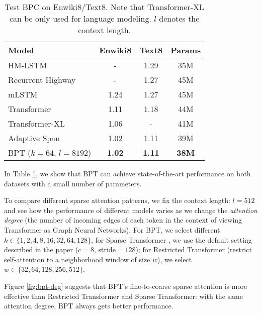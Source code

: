 \documentclass[11pt,a4paper]{article}
\begin{document}
\begin{table}[!htb]
\small\setlength{\tabcolsep}{2pt}
\centering
\begin{tabular}{p{14em}ccc}
\toprule
Model              & Enwiki8 & Text8 & Params \\
\midrule
HM-LSTM~\cite{ChungAB17}           & -      & 1.29 & 35M  \\
Recurrent Highway~\cite{ZillySKS17}  & -      & 1.27  & 45M \\
mLSTM~\cite{krause2016multiplicative}             & 1.24   & 1.27 & 45M \\
\midrule
Transformer~\cite{al2018character} & 1.11   & 1.18 & 44M \\
Transformer-XL~\cite{dai2019transformer}     & 1.06   & - & 41M \\
Adaptive Span~\cite{sukhbaatar2019adaptive} & 1.02 & 1.11 & 39M \\
\midrule
BPT ($k=64$, $l=8192$)       & \bf{1.02} & \bf{1.11} & \bf{38M} \\
\bottomrule
\end{tabular}
\caption{Test BPC on Enwiki8/Text8.  Note that Transformer-XL can be only used for language modeling. $l$ denotes the context length.}
\label{tbl:char}
\end{table}

In Table \ref{tbl:char}, we show that BPT can achieve state-of-the-art performance on both datasets with a small number of parameters.

To compare different sparse attention patterns, we fix the context length: $l=512$ and see how the performance of different models varies as we change the \textit{attention degree} (the number of incoming edges of each token in the context of viewing Transformer as Graph Neural Networks). For BPT, we select different $k\in \{1,2,4,8,16,32,64,128\}$, for Sparse Transformer \citep{child2019sparsetransformer}, we use the default setting described in the paper ($c=8$, $\mathrm{stride}=128$); for Restricted Transformer \citep{vaswani2017attention} (restrict self-attention to a neighborhood window of size $w$), we select $w\in\{32, 64, 128, 256, 512\}$.

Figure \ref{fig:bpt-deg} suggests that BPT's fine-to-coarse sparse attention is more effective than Restricted Transformer and Sparse Transformer: with the same attention degree, BPT always gets better performance.
\end{document}
